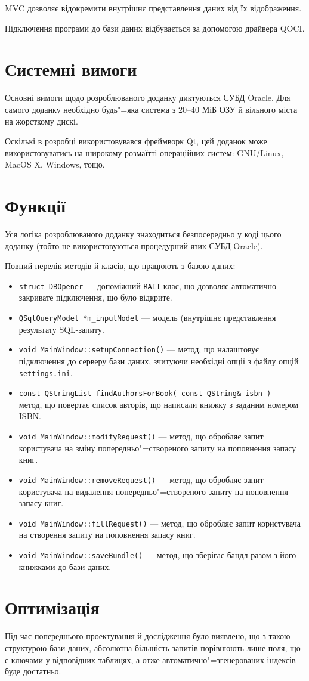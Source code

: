 \documentclass[a4paper,notitlepage,headsepline,pdftex,oneside]{report}
\newcommand{\setfontsize}[1]{\fontsize{#1pt}{#1pt}\selectfont}
\newcommand{\Section}[1]{\section{#1} \renewcommand{\baselinestretch}{1.5}\setfontsize{14pt}}
\begin{document}
  MVC дозволяє відокремити внутрішнє представлення даних від їх відображення.

  Підключення програми до бази даних відбувається за допомогою драйвера QOCI.

  \Section{Системні вимоги}
    Основні вимоги щодо розроблюваного доданку диктуються СУБД Oracle.
    Для самого доданку необхідно будь"=яка система з 20--40 МіБ ОЗУ й вільного
    міста на жорсткому дискі.

    Оскількі в розробці використовувався фреймворк Qt, цей доданок може
    використовуватись на широкому розмаїтті операційних систем: GNU/Linux,
    MacOS X, Windows, тощо.
  \Section{Функції}
    Уся логіка розроблюваного доданку знаходиться безпосередньо у коді цього
    доданку (тобто не використовуються процедурний язик СУБД Oracle).

    Повний перелік методів й класів, що працюють з базою даних:
    \begin{itemize}
      \item \verb'struct DBOpener' --- допоміжний \texttt{RAII}-клас, що
        дозволяє автоматично закривате підключення, що було відкрите.
      \item \verb'QSqlQueryModel *m_inputModel' --- модель (внутрішнє
        представлення результату SQL-запиту.
      \item \verb'void MainWindow::setupConnection()' --- метод, що налаштовує
        підключення до серверу бази даних, зчитуючи необхідні опції з файлу
        опцій \texttt{settings.ini}.
      \item \verb'const QStringList findAuthorsForBook( const QString& isbn )'
        --- метод, що повертає список авторів, що написали книжку з заданим
        номером ISBN.
      \item \verb'void MainWindow::modifyRequest()' --- метод, що обробляє
        запит користувача на зміну попередньо"=створеного запиту на поповнення
        запасу книг.
      \item \verb'void MainWindow::removeRequest()' --- метод, що обробляє
        запит користувача на видалення попередньо"=створеного запиту на
        поповнення запасу книг.
      \item \verb'void MainWindow::fillRequest()' --- метод, що обробляє
        запит користувача на створення запиту на поповнення запасу книг.
      \item \verb'void MainWindow::saveBundle()' --- метод, що зберігає бандл
        разом з його книжками до бази даних.
    \end{itemize}
  \Section{Оптимізація}
    Під час попереднього проектування й дослідження було виявлено, що з такою
    структурою бази даних, абсолютна більшість запитів порівнюють лише поля,
    що є ключами у відповідних таблицях, а отже автоматично"=згенерованих
    індексів буде достатньо.
\end{document}
